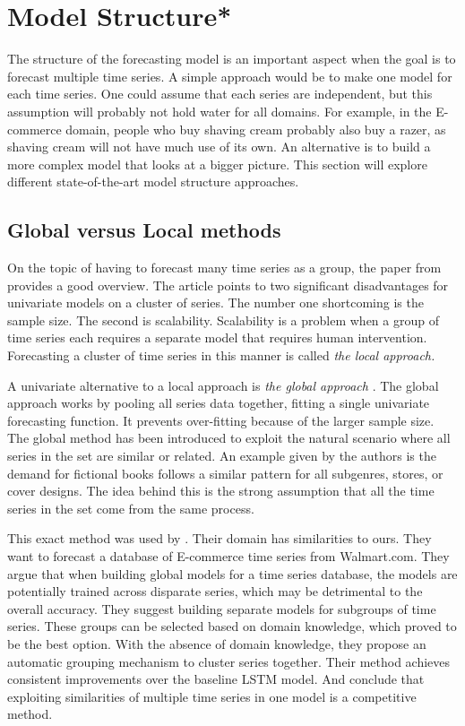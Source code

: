 \section{Model Structure*}
\label{section:RelatedWork:Model-structure}
The structure of the forecasting model is an important aspect when the goal is to forecast
multiple time series.
A simple approach would be to make one model for each time series.
One could assume that each series are independent, but this assumption will probably not hold water for all domains.
For example, in the E-commerce domain,
people who buy shaving cream probably also buy a razer, as shaving cream will not have much use of its own.
An alternative is to build a more complex model that looks at a bigger picture.
This section will explore different state-of-the-art model structure approaches.

\subsection{Global versus Local methods}
\label{section:RelatedWork:Model-structure:local-vs-global}
On the topic of having to forecast many time series as a group, the paper from \cite{Montero-Manso2021} provides a good overview.
The article points to two significant disadvantages for univariate models on a cluster of series.
The number one shortcoming is the sample size. The second is scalability.
Scalability is a problem when a group of time series each requires a separate model
that requires human intervention. Forecasting a cluster of time series in this manner is called
\textit{the local approach.}

A univariate alternative to a local approach is \textit{the global approach}
\citep{Rabanser2020}.
The global approach works by pooling all series data together, fitting a single univariate forecasting function. It prevents over-fitting because of the larger sample size.
The global method has been introduced to exploit the natural scenario where all series
in the set are similar or related. An example given by the authors is the demand for fictional
books follows a similar pattern for all subgenres, stores, or cover designs.
The idea behind this is the strong assumption that all the time series in the set
come from the same process.

This exact method was used by \cite{Bandara2017}.
Their domain has similarities to ours.
They want to forecast a database of E-commerce time series
from Walmart.com.
They argue that when building global models for a time series database, the models are
potentially trained across disparate series, which may be detrimental to the overall accuracy.
They suggest building separate models for subgroups of time series.
These groups can be selected based on domain knowledge, which proved to be the best option. With the absence of
domain knowledge, they propose an automatic grouping mechanism to cluster series together.
Their method achieves consistent improvements over the baseline LSTM model.
And conclude that exploiting similarities of multiple time series in one model is a competitive method.

